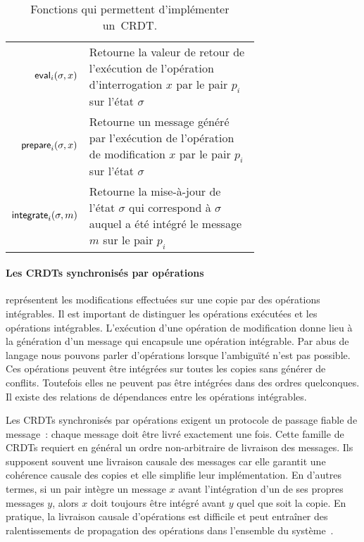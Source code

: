 \begin{table}[htb]
\centering
\begin{tabular}{rp{0.7\linewidth}}
    $\operatorname{\mathsf{eval}}_i(\sigma, x)$ & Retourne la valeur de retour de l'exécution de l'opération d'interrogation $x$ par le pair $p_i$ sur l'état $\sigma$ \\
    $\operatorname{\mathsf{prepare}}_i(\sigma, x)$ & Retourne un message généré par l'exécution de l'opération de modification $x$ par le pair $p_i$ sur l'état $\sigma$ \\
    $\operatorname{\mathsf{integrate}}_i(\sigma, m)$ & Retourne la mise-à-jour de l'état $\sigma$ qui correspond à $\sigma$ auquel a été intégré le message $m$ sur le pair $p_i$\\
\end{tabular}
\caption[Fonctions qui permettent d'implémenter un~\acs{CRDT}]{Fonctions qui permettent d'implémenter un~\ac{CRDT}.}\label{tab:crdt-impl-func}
\end{table}


\paragraph{Les \acp{CRDT} synchronisés par opérations~\autocite{baquero_2014_pure-op-crdt,baquero_2018_pure-op-crdt}} représentent les modifications effectuées sur une copie par des opérations intégrables.
Il est important de distinguer les opérations exécutées et les opérations intégrables.
L'exécution d'une opération de modification donne lieu à la génération d'un message qui encapsule une opération intégrable.
Par abus de langage nous pouvons parler d'opérations lorsque l'ambiguïté n'est pas possible.
Ces opérations peuvent être intégrées sur toutes les copies sans générer de conflits.
Toutefois elles ne peuvent pas être intégrées dans des ordres quelconques.
Il existe des relations de dépendances entre les opérations intégrables.

Les \acp{CRDT} synchronisés par opérations exigent un protocole de passage fiable de message~: chaque message doit être livré exactement une fois.
Cette famille de \acp{CRDT} requiert en général un ordre non-arbitraire de livraison des messages.
Ils supposent souvent une livraison causale des messages car elle garantit une cohérence causale des copies et elle simplifie leur implémentation.
En d'autres termes, si un pair intègre un message $x$ avant l'intégration d'un de ses propres messages $y$, alors $x$ doit toujours être intégré avant $y$ quel que soit la copie.
En pratique, la livraison causale d'opérations est difficile et peut entraîner des ralentissements de propagation des opérations dans l'ensemble du système~\autocite{alvisi_2017_writes-dirty-secret}.

